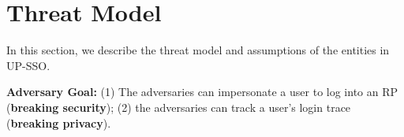 \section{Threat Model}
\label{sec:threatmodel}
In this section, we describe the threat model and assumptions of the entities in UP-SSO.

\vspace{1mm}\noindent\textbf{Adversary Goal: }(1) The adversaries can impersonate a user to log into an RP (\textbf{breaking security}); (2) the adversaries can track a user's login trace (\textbf{breaking privacy}).
\begin{comment}
\item \noindent\textbf{Breaking the security. }The adversaries can impersonate an honest user to log in to the honest RP.
\item \noindent\textbf{Breaking the privacy. }The adversaries can track a user's login trace on each RP.
\end{comment}

